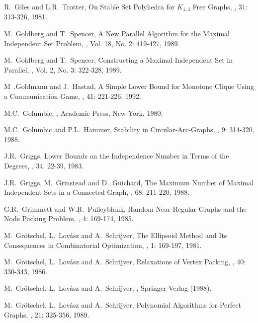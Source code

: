\begin{thebibliography}{10}
R.~Giles and L.R.~Trotter,
\newblock On Stable Set Polyhedra for $K_{1,3}$ Free Graphs,
, 31: 313-326, 1981.

M.~Goldberg and T.~Spencer,
\newblock A New Parallel Algorithm for the Maximal Independent Set
Problem,
, Vol. 18, No. 2: 419-427, 1989.

M.~Goldberg and T.~Spencer,
\newblock Constructing a Maximal Independent Set in Parallel,
, Vol. 2, No. 3: 322-328, 1989.

M~.Goldmann and J.~Hastad,
\newblock A Simple Lower Bound for Monotone Clique Using a
Communication Game,
, 41: 221-226, 1992.

M.C.~Golumbic,
,
\newblock Academic Press, New York, 1980.

M.C.~Golumbic and P.L.~Hammer,
\newblock Stability in Circular-Arc-Graphs,
, 9: 314-320, 1988.

J.R.~Griggs,
\newblock Lower Bounds on the Independence Number in Terms of the
Degrees,
, 34: 22-39, 1983.

J.R.~Griggs, M.~Grinstead and D.~Guichard,
\newblock The Maximum Number of Maximal Independent Sets in a
Connected Graph,
, 68: 211-220, 1988.

G.R.~Grimmett and W.R.~Pulleyblank,
\newblock Random Near-Regular Graphs and the Node Packing Problem,
, 4: 169-174, 1985.

M.~Gr\"{o}tschel, L.~Lov\'{a}sz and A.~Schrijver, 
\newblock The Ellipsoid Method and Its Consequences in Combinatorial
Optimization,
, 1: 169-197, 1981.

M.~Gr\"{o}tschel, L.~Lov\'{a}sz and A.~Schrijver, 
\newblock Relaxations of Vertex Packing,
, 40: 330-343, 1986.

M.~Gr\"{o}tschel, L.~Lov\'{a}sz and A.~Schrijver, 
,
\newblock Springer-Verlag (1988).

M.~Gr\"{o}tschel, L.~Lov\'{a}sz and A.~Schrijver, 
\newblock Polynomial Algorithms for Perfect Graphs,
, 21: 325-356, 1989.


\end{thebibliography}
